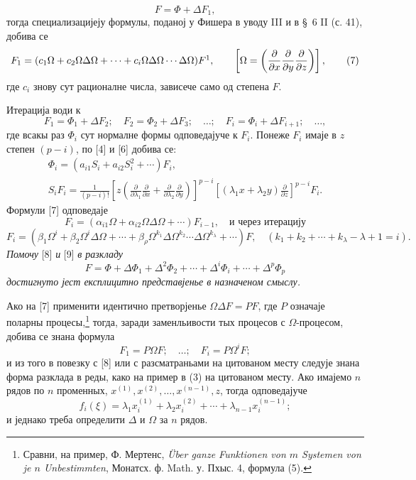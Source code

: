 \documentclass[11pt]{article}
\providecommand{\p}{\partial}
\begin{document}
\begin{equation}
        F=\Phi+\Delta F_1,
\tag{2a}
\end{equation}
тогда специализацијеју формулы, поданој у Фишера в уводу III и в \S~6 II (с. 41), добива се
\begin{equation}
        F_1=(c_1\Omega+c_2\Omega\Delta\Omega+\cdots+c_i\Omega\Delta\Omega\cdots\Delta\Omega)F\footnotemark,
        \qquad \left[\Omega=\left(\frac{\p}{\p x}\frac{\p}{\p y}\frac{\p}{\p z}\right)\right],
\tag{7}
\end{equation}
где \(c_i\) знову сут рационалне числа, зависече само од степена \(F\).

Итерација води к
\[
        F_1=\Phi_1+\Delta F_2;\quad F_2=\Phi_2+\Delta F_3;\quad\ldots;\quad
        F_i=\Phi_i+\Delta F_{i+1};\quad\ldots,
\]
где всакы раз \(\Phi_i\) сут нормалне формы одповедајуче к \(F_i\). Понеже \(F_i\) имаје в \(z\) степен \((p-i)\), по [4] и [6] добива се:
\begin{equation}
\begin{gathered}
        \Phi_i=(a_{i1}S_i+a_{i2}S_i^2+\cdots)F_i,\\
        S_iF_i=\frac1{(p-i)!}
        \left[z\left(\frac{\p}{\p\lambda_1}\frac{\p}{\p x}+
        \frac{\p}{\p\lambda_2}\frac{\p}{\p y}\right)\right]^{p-i}
        \left[(\lambda_1x+\lambda_2y)\frac{\p}{\p z}\right]^{p-i}F_i.
\end{gathered}
\tag{8}
\end{equation}
Формули [7] одповедаје
\[
        F_i=(\alpha_{i1}\Omega+\alpha_{i2}\Omega\Delta\Omega+\cdots)F_{i-1},
        \quad\text{и через итерацију}
\]
\begin{equation}
        F_i=(\beta_1\Omega^i+\beta_2\Omega^i\Delta\Omega+\cdots
        +\beta_\rho\Omega^{k_1}\Delta\Omega^{k_2}\cdots\Delta\Omega^{k_\lambda}+\cdots)F,
        \quad(k_1+k_2+\cdots+k_\lambda-\lambda+1=i).
\tag{9}
\end{equation}
{\itshape Помочу} [8] {\itshape и} [9] {\itshape в разкладу}
\[
        F=\Phi+\Delta\Phi_1+\Delta^2\Phi_2+\cdots+\Delta^i\Phi_i+\cdots+\Delta^p\Phi_p
\]
{\itshape достигнуто јест експлицитно представјенье в назначеном смыслу.}

Ако на [7] применити идентично претворјенье \(\Omega\Delta F=PF\), где \(P\) означаје поларны процесы,\footnote{Сравни, на пример, Ф. Мертенс, \emph{Über ganze Funktionen von \(m\) Systemen von je \(n\) Unbestimmten}, Монатсх. ф. Math. у. Пхыс. 4, формула (5).} тогда, заради заменльивости тых процесов с \(\Omega\)-процесом, добива се знана формула
\[
        F_1=P\Omega F;\quad\ldots;\quad F_i=P\Omega^iF;
\]
и из того в повезку с [8] или с разсматраньами на цитованом месту следује знана форма разклада в реды, како на пример в (3) на цитованом месту. Ако имајемо \(n\) рядов по \(n\) променных, \(x^{(1)},x^{(2)},\ldots,x^{(n-1)},z\), тогда одповедајуче
\[
        f_i(\xi)=\lambda_1x_i^{(1)}+\lambda_2x_i^{(2)}+\cdots+\lambda_{n-1}x_i^{(n-1)};
\]
и једнако треба определити \(\Delta\) и \(\Omega\) за \(n\) рядов.
\end{document}
